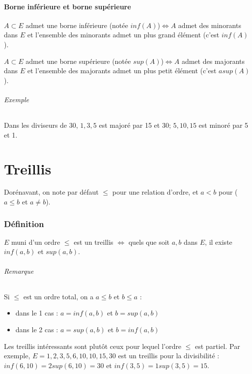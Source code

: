 \documentclass[11pt]{article}
\begin{document}
        \subsection{Borne inférieure et borne supérieure}
            $A\subset E$ admet une borne inférieure (notée $inf(A)$)$\Leftrightarrow A$ admet des minorants dans $E$ et l'ensemble des minorants admet un plus grand élément (c'est $inf(A)$).

            $A\subset E$ admet une borne supérieure (notée $sup(A)$)$\Leftrightarrow A$ admet des majorants dans $E$ et l'ensemble des majorants admet un plus petit élément (c'est $asup(A)$).

            \paragraph{Exemple} Dans les diviseurs de 30, ${1,3,5}$ est majoré par 15 et 30; ${5,10,15}$ est minoré par 5 et 1.

\newpage
\part{Treillis}
    Dorénavant, on note par défaut $\leq$ pour une relation d'ordre, et $a<b$ pour ($a\leq b$ et $a\neq b$).

    \section{Définition}
        $E$ muni d'un ordre $\leq$ est un treillis $\Leftrightarrow$ quels que soit $a,b$ dans $E$, il existe $inf(a,b)$ et $sup(a,b)$.

        \paragraph{Remarque} Si $\leq$ est un ordre total, on a $a\leq b$ et $b\leq a$ :
            \begin{itemize}
                \item dans le 1 cas : $a=inf(a,b)$ et $b=sup(a,b)$
                \item dans le 2 cas : $a=sup(a,b)$ et $b=inf(a,b)$
            \end{itemize}

        Les treillis intéressants sont plutôt ceux pour lequel l'ordre $\leq$ est partiel. Par exemple, $E={1,2,3,5,6,10,10,15,30}$ est un treillis pour la divisibilité : $inf(6,10)=2sup(6,10)=30$ et $inf(3,5)=1sup(3,5)=15$.
\end{document}
